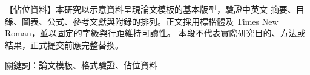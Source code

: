 【佔位資料】本研究以示意資料呈現論文模板的基本版型，驗證中英文
摘要、目錄、圖表、公式、參考文獻與附錄的排列。正文採用標楷體及
Times New Roman，並以固定的字級與行距維持可讀性。
本段不代表實際研究目的、方法或結果，正式提交前應完整替換。

關鍵詞：論文模板、格式驗證、佔位資料
